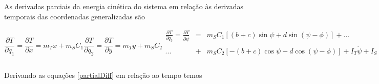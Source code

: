 \documentclass[sublist]{fei}
\begin{document}
As derivadas parciais da energia cinética do sistema em relação às derivadas temporais das coordenadas generalizadas são

\begin{subequations} \label{partialDiff}
\begin{equation}
    \frac{\partial T}{\partial \dot{q}_1} = \frac{\partial T}{\partial \dot{x}} = m_{T} \dot{x} + m_S C_1
\end{equation}
\begin{equation}
    \frac{\partial T}{\partial \dot{q}_2} = \frac{\partial T}{\partial \dot{y}} = m_{T} \dot{y} + m_S C_2
\end{equation}
\begin{eqnarray}
    \nonumber
    \frac{\partial T}{\partial q_3} = \frac{\partial T}{\partial \dot{\psi}} &=& m_S C_1 \left[ \left( b + c \right) \sin \psi + d \sin \left( \psi - \phi \right) \right] + ... \\
    \nonumber
    ... &+& m_S C_2 \left[ - \left( b + c \right) \cos \psi - d \cos \left( \psi - \phi \right) \right] + I_T \dot{\psi} + I_S \left( \dot{\psi} - \dot{\phi} \right) \\
\end{eqnarray}
\begin{equation}
    \frac{\partial T}{\partial q_4} = \frac{\partial T}{\partial \dot{\phi}} = m_S C_1 \left[ - d \sin \left( \psi - \phi \right) \right] + m_S C_2 \left[ d \cos \left( \psi - \phi \right) \right] - I_S \left( \dot{\psi} - \dot{\phi} \right).
\end{equation}
\end{subequations}

Derivando as equações \eqref{partialDiff} em relação ao tempo temos
\end{document}
